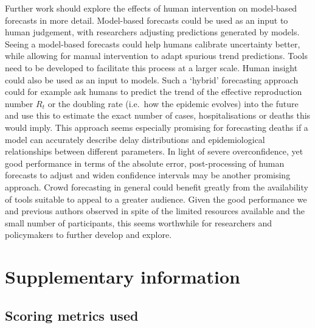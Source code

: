 \documentclass[
]{article}
\begin{document}
Further work should explore the effects of human intervention on model-based forecasts in more detail. Model-based forecasts could be used as an input to human judgement, with researchers adjusting predictions generated by models. Seeing a model-based forecasts could help humans calibrate uncertainty better, while allowing for manual intervention to adapt spurious trend predictions. Tools need to be developed to facilitate this process at a larger scale. Human insight could also be used as an input to models. Such a `hybrid' forecasting approach could for example ask humans to predict the trend of the effective reproduction number \(R_t\) or the doubling rate (i.e.~how the epidemic evolves) into the future and use this to estimate the exact number of cases, hospitalisations or deaths this would imply. This approach seems especially promising for forecasting deaths if a model can accurately describe delay distributions and epidemiological relationships between different parameters. In light of severe overconfidence, yet good performance in terms of the absolute error, post-processing of human forecasts to adjust and widen confidence intervals may be another promising approach. Crowd forecasting in general could benefit greatly from the availability of tools suitable to appeal to a greater audience. Given the good performance we and previous authors observed in spite of the limited resources available and the small number of participants, this seems worthwhile for researchers and policymakers to further develop and explore.

\hypertarget{appendix-supplementary-information}{%
\appendix}


\hypertarget{supplementary-information}{%
\section{Supplementary information}\label{supplementary-information}}

\hypertarget{scoring-metrics-used}{%
\subsection{Scoring metrics used}\label{scoring-metrics-used}}
\end{document}
